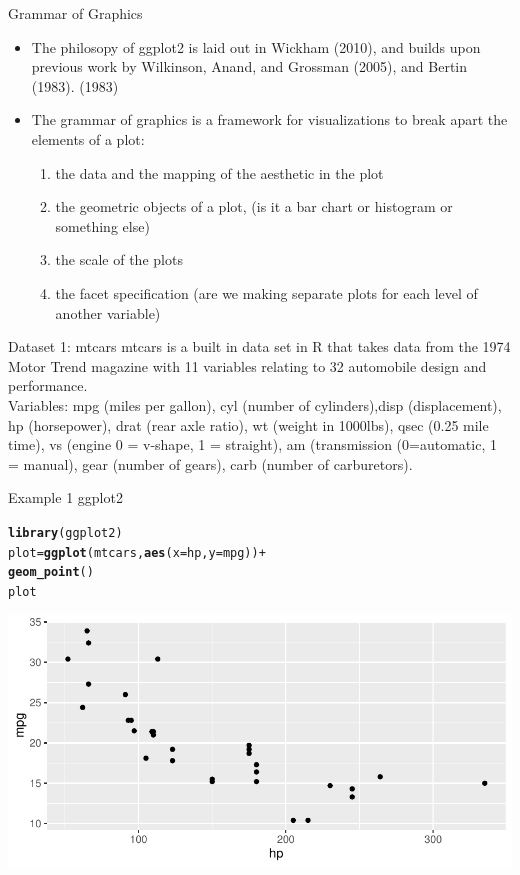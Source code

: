 \documentclass{beamer}\usepackage[]{graphicx}\usepackage[]{color}
\makeatletter
\newcommand{\hlopt}[1]{\textcolor[rgb]{0,0,0}{#1}}%
\newcommand{\hlstd}[1]{\textcolor[rgb]{0.345,0.345,0.345}{#1}}%
\newcommand{\hlkwb}[1]{\textcolor[rgb]{0.69,0.353,0.396}{#1}}%
\newcommand{\hlkwc}[1]{\textcolor[rgb]{0.333,0.667,0.333}{#1}}%
\newcommand{\hlkwd}[1]{\textcolor[rgb]{0.737,0.353,0.396}{\textbf{#1}}}%
\newenvironment{kframe}{%
 \def\at@end@of@kframe{}%
 \ifinner\ifhmode%
  \def\at@end@of@kframe{\end{minipage}}%
  \begin{minipage}{\columnwidth}%
 \fi\fi%
 \def\FrameCommand##1{\hskip\@totalleftmargin \hskip-\fboxsep
 \colorbox{shadecolor}{##1}\hskip-\fboxsep
     \hskip-\linewidth \hskip-\@totalleftmargin \hskip\columnwidth}%
 \MakeFramed {\advance\hsize-\width
   \@totalleftmargin\z@ \linewidth\hsize
   \@setminipage}}%
 {\par\unskip\endMakeFramed%
 \at@end@of@kframe}
\newenvironment{knitrout}{}{} %
\makeatother
\begin{document}
\begin{frame}{Grammar of Graphics}
\begin{itemize}
\item The philosopy of ggplot2 is laid out in Wickham (2010), and builds upon previous work by Wilkinson, Anand, and Grossman (2005), and Bertin (1983).
(1983)
\item The grammar of graphics is a framework for visualizations to break apart the elements of a plot:
\begin{enumerate}
\item the data and the mapping of the aesthetic in the plot
\item the geometric objects of a plot,  (is it a bar chart or histogram or something else)
\item the scale of the plots
\item the facet specification (are we making separate plots for each level of another variable)
\end{enumerate}
\end{itemize}

\end{frame}




\begin{frame}{Dataset 1: mtcars}
mtcars is a built in data set in R that takes data from the 1974 Motor Trend magazine with 11 variables relating to 32 automobile design and performance.  \\
Variables: mpg (miles per gallon), cyl (number of cylinders),disp (displacement), hp (horsepower), drat (rear axle ratio), wt (weight in 1000lbs), qsec (0.25 mile time), vs (engine 0 = v-shape, 1 = straight), am (transmission (0=automatic, 1 = manual), gear (number of gears), carb (number of carburetors).
\end{frame}

\begin{frame}[fragile]{Example 1 ggplot2}
\begin{knitrout}
\color{fgcolor}\begin{kframe}
\begin{alltt}
\hlkwd{library}\hlstd{(ggplot2)}
\hlstd{plot} \hlkwb{=} \hlkwd{ggplot}\hlstd{(mtcars,} \hlkwd{aes}\hlstd{(}\hlkwc{x} \hlstd{= hp,} \hlkwc{y} \hlstd{= mpg))} \hlopt{+}
    \hlkwd{geom_point}\hlstd{()}
\hlstd{plot}
\end{alltt}
\end{kframe}
\includegraphics[width=0.95\linewidth]{figure/unnamed-chunk-2-1} 
\end{knitrout}
\end{frame}
\end{document}
